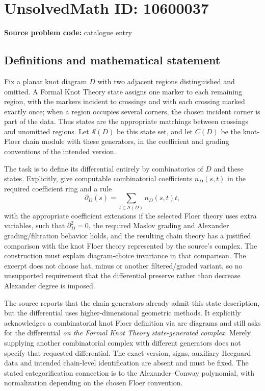 \documentclass[11pt]{article}
\begin{document}
\section*{UnsolvedMath ID: 10600037}
\textbf{Source problem code:} catalogue entry
\subsection{Definitions and mathematical statement}
Fix a planar knot diagram \(D\) with two adjacent regions distinguished and omitted. A Formal Knot Theory state assigns one marker to each remaining region, with the markers incident to crossings and with each crossing marked exactly once; when a region occupies several corners, the chosen incident corner is part of the data. Thus states are the appropriate matchings between crossings and unomitted regions. Let \(\mathcal S(D)\) be this state set, and let \(C(D)\) be the knot-Floer chain module with these generators, in the coefficient and grading conventions of the intended version.

The task is to define its differential entirely by combinatorics of \(D\) and these states. Explicitly, give computable combinatorial coefficients \(n_D(s,t)\) in the required coefficient ring and a rule
\[\partial_D(s)=\sum_{t\in\mathcal S(D)}n_D(s,t)t,\]
with the appropriate coefficient extensions if the selected Floer theory uses extra variables, such that \(\partial_D^2=0\), the required Maslov grading and Alexander grading/filtration behavior holds, and the resulting chain theory has a justified comparison with the knot Floer theory represented by the source's complex. The construction must explain diagram-choice invariance in that comparison. The excerpt does not choose hat, minus or another filtered/graded variant, so no unsupported requirement that the differential preserve rather than decrease Alexander degree is imposed.

The source reports that the chain generators already admit this state description, but the differential uses higher-dimensional geometric methods. It explicitly acknowledges a combinatorial knot Floer definition via arc diagrams and still asks for the differential \emph{on the Formal Knot Theory state-generated complex}. Merely supplying another combinatorial complex with different generators does not specify that requested differential. The exact version, signs, auxiliary Heegaard data and intended chain-level identification are absent and must be fixed. The stated categorification connection is to the Alexander--Conway polynomial, with normalization depending on the chosen Floer convention.
\end{document}

